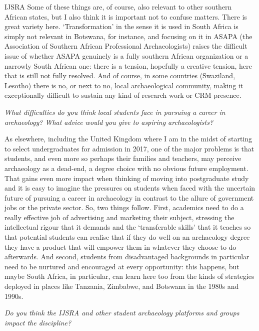 \begin{labeling}{IJSRA}
Some of these things are, of course, also relevant to other southern African states, but I also think it is important not to confuse matters. There is great variety here. ‘Transformation’ in the sense it is used in South Africa is simply not relevant in Botswana, for instance, and focusing on it in ASAPA (the Association of Southern African Professional Archaeologists) raises the difficult issue of whether ASAPA genuinely is a fully southern African organization or a narrowly South African one: there is a tension, hopefully a creative tension, here that is still not fully resolved. And of course, in some countries (Swaziland, Lesotho) there is no, or next to no, local archaeological community, making it exceptionally difficult to sustain any kind of research work or CRM presence.

\item[IJSRA] \emph{What difficulties do you think local students face in pursuing a career in archaeology? What advice would you give to aspiring archaeologists?}
	
\item[PM] As elsewhere, including the United Kingdom where I am in the midst of starting to select undergraduates for admission in 2017, one of the major problems is that students, and even more so perhaps their families and teachers, may perceive archaeology as a dead-end, a degree choice with no obvious future employment. That gains even more impact when thinking of moving into postgraduate study and it is easy to imagine the pressures on students when faced with the uncertain future of pursuing a career in archaeology in contrast to the allure of government jobs or the private sector. So, two things follow. First, academics need to do a really effective job of advertising and marketing their subject, stressing the intellectual rigour that it demands and the ‘transferable skills’ that it teaches so that potential students can realise that if they do well on an archaeology degree they have a product that will empower them in whatever they choose to do afterwards. And second, students from disadvantaged backgrounds in particular need to be nurtured and encouraged at every opportunity: this happens, but maybe South Africa, in particular, can learn here too from the kinds of strategies deployed in places like Tanzania, Zimbabwe, and Botswana in the 1980s and 1990s.

\item[IJSRA] \emph{Do you think the IJSRA and other student archaeology platforms and groups impact the discipline?}
	

\end{labeling}
